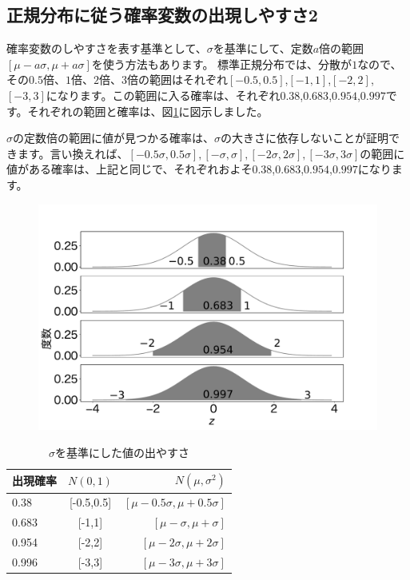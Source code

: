 \subsection{正規分布に従う確率変数の出現しやすさ2}
確率変数のしやすさを表す基準として、$\sigma$を基準にして、定数$a$倍の範囲$[\mu-a\sigma,\mu+a\sigma]$を使う方法もあります。
標準正規分布では、分散が$1$なので、その$0.5$倍、$1$倍、$2$倍、$3$倍の範囲はそれぞれ$[-0.5,0.5]$,$[-1,1]$,$[-2,2]$,$[-3,3]$になります。この範囲に入る確率は、それぞれ$0.38$,$0.683$,$0.954$,$0.997$です。それぞれの範囲と確率は、図\ref{fig:sigma_interval_probability}に図示しました。

$\sigma$の定数倍の範囲に値が見つかる確率は、$\sigma$の大きさに依存しないことが証明できます。言い換えれば、$[-0.5\sigma,0.5\sigma],[-\sigma,\sigma],[-2\sigma,2\sigma],[-3\sigma,3\sigma]$の範囲に値がある確率は、上記と同じで、それぞれおよそ$0.38$,$0.683$,$0.954$,$0.997$になります。


\begin{figure}
    \begin{center}
        \includegraphics[width=15cm]{./image/02_/sigma_value.pdf}
        \label{fig:sigma_interval_probability}
      \end{center}
\end{figure}

\begin{table}[hbtp]
    \caption{$\sigma$を基準にした値の出やすさ}
    \centering
    \begin{tabular}{lcr}
        \hline
        出現確率  & $N(0,1)$  &  $N(\mu,\sigma^2)$ \\
        \hline \hline
        0.38 & [-0.5,0.5]  & $[\mu-0.5\sigma,\mu+0.5\sigma]$ \\
        0.683 & [-1,1] & $[\mu-\sigma,\mu+\sigma]$\\
        0.954 & [-2,2] & $[\mu-2\sigma,\mu+2\sigma]$\\
        0.996 & [-3,3] & $[\mu-3\sigma,\mu+3\sigma]$\\
    \end{tabular}
\end{table}



